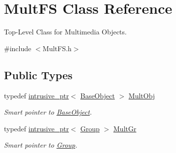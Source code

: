 \hypertarget{classMultFS}{\section{Mult\-F\-S Class Reference}
\label{classMultFS}
}


Top-\/\-Level Class for Multimedia Objects.  




{\ttfamily \#include $<$Mult\-F\-S.\-h$>$}

\subsection*{Public Types}
\begin{DoxyCompactItemize}
\item 
\hypertarget{classMultFS_a3862987abee233b7ea08a67abc80b245}{typedef \hyperlink{classintrusive__ptr}{intrusive\-\_\-ptr}$<$ \hyperlink{classBaseObject}{Base\-Object} $>$ \hyperlink{classMultFS_a3862987abee233b7ea08a67abc80b245}{Mult\-Obj}}\label{classMultFS_a3862987abee233b7ea08a67abc80b245}

\begin{DoxyCompactList}\small\item\em Smart pointer to \hyperlink{classBaseObject}{Base\-Object}. \end{DoxyCompactList}\item 
\hypertarget{classMultFS_a0c5fea8cc8ab29c2624d5863cf75cc6f}{typedef \hyperlink{classintrusive__ptr}{intrusive\-\_\-ptr}$<$ \hyperlink{classGroup}{Group} $>$ \hyperlink{classMultFS_a0c5fea8cc8ab29c2624d5863cf75cc6f}{Mult\-Gr}}\label{classMultFS_a0c5fea8cc8ab29c2624d5863cf75cc6f}

\begin{DoxyCompactList}\small\item\em Smart pointer to \hyperlink{classGroup}{Group}. \end{DoxyCompactList}\end{DoxyCompactItemize}
